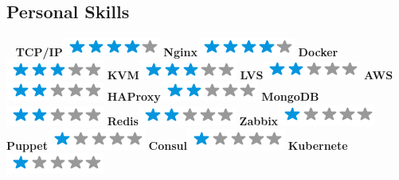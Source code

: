 \documentclass[]{friggeri-cv}
\begin{document}
\begin{aside}
  \section{Personal Skills}
  ~
  \textbf{TCP/IP}\includegraphics[scale=0.40]{img/4stars.png}
  \textbf{Nginx}\includegraphics[scale=0.40]{img/4stars.png}
  \textbf{Docker}\includegraphics[scale=0.40]{img/3stars.png}
  \textbf{KVM}\includegraphics[scale=0.40]{img/3stars.png}
  \textbf{LVS}\includegraphics[scale=0.40]{img/2stars.png}
  \textbf{AWS}\includegraphics[scale=0.40]{img/2stars.png}
  \textbf{HAProxy}\includegraphics[scale=0.40]{img/2stars.png}
  \textbf{MongoDB}\includegraphics[scale=0.40]{img/2stars.png}
  \textbf{Redis}\includegraphics[scale=0.40]{img/2stars.png}
  \textbf{Zabbix}\includegraphics[scale=0.40]{img/1stars.png}
  \textbf{Puppet}\includegraphics[scale=0.40]{img/1stars.png}
  \textbf{Consul}\includegraphics[scale=0.40]{img/1stars.png}
  \textbf{Kubernete}\includegraphics[scale=0.40]{img/1stars.png}
  ~
  ~
\end{aside}
\end{document}
